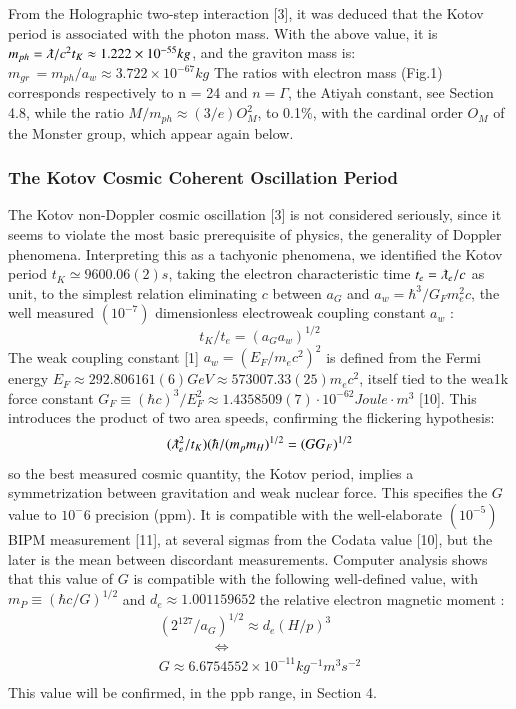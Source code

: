 \documentclass[twoside,draft]{article}
\begin{document}
\begin{sloppypar}
{From the Holographic two-step interaction [3], it was deduced that the Kotov period is
associated with the photon mass. With the above value, it is $m_{ph} = \lambdabar/c^{2} t_{K} \approx 1.222 \times 10^{-55} kg$, and the graviton mass is: 
$m_{gr}\, = m_{ph} /a_{w} \approx 3.722 \times 10^{-67} kg$
The ratios with electron mass (Fig.1) corresponds respectively to n = 24 and $n = \Gamma$, the Atiyah constant, see Section 4.8, while the ratio $M/m_{ph} \approx (3/e)O^2_M$, to 0.1\%, with the cardinal order $O_M$ of the Monster group, which appear again below.

\subsubsection{The Kotov Cosmic Coherent Oscillation Period}

The Kotov non-Doppler cosmic oscillation [3] is not considered seriously, since it seems to
violate the most basic prerequisite of physics, the generality of Doppler phenomena. Interpreting
this as a tachyonic phenomena, we identified the Kotov period $t_{K} \simeq 9600.06(2) s$, taking the electron
characteristic time $t_{e} = \lambdabar_{e} /c$ as unit, to the simplest relation eliminating $c$ between $a_{G}$ and $a_{w}=
\hbar^{3} /G_{F} m_{e}^{2} c$, the well measured $(10^{-7})$ dimensionless electroweak coupling constant $a_{w}$ :
\begin{equation}
t_{K} / t_{e} = (a_{G} a_{w})^{1/2}
\end{equation}
The weak coupling constant [1] $a_{w} = (E_{F} /m_{e} c^{2} )^{2}$ is defined from the Fermi energy 
$
E_{F} \approx 292.806161(6) GeV \approx 573007.33(25) m_{e} c^{2}
$, itself tied to the wea1k force constant 
$
G_{F} \equiv (\hbar c)^{3} /E_{F}^{2} \approx
1.4358509(7) \cdot 10^{-62} Joule \cdot m^{3}
$
[10]. This introduces the product of two area speeds, confirming the
flickering hypothesis:
\begin{equation}
(\lambdabar_{e}^2/t_{K} )(\hbar/(m_{p} m_{H})^{1/2} = (GG_{F})^{1/2}
\end{equation}
so the best measured cosmic quantity, the Kotov period, implies a symmetrization between
gravitation and weak nuclear force. This specifies the $G$ value to $10^-{6}$ precision (ppm). It is
compatible with the well-elaborate $(10^{-5})$ BIPM measurement [11], at several sigmas from the Codata
value [10], but the later is the mean between discordant measurements.
Computer analysis shows that this value of $G$ is compatible with the following well-defined value, with $m_{P} \equiv (\hbar c/G)^{1/2}$ and $d_{e} \approx 1.001159652$ the relative electron magnetic moment :
$$\begin{array}{ll}
(2^{127} /a_{G} )^{1/2} \approx d_{e} (H/p)^{3} \\
\qquad  \qquad \Leftrightarrow \\
G \approx 6.6754552 \times 10^{-11} kg^{-1} m^{3} s^{-2} \\
\end{array}$$
This value will be confirmed, in the ppb range, in Section 4.

}
\end{sloppypar}
\end{document}
